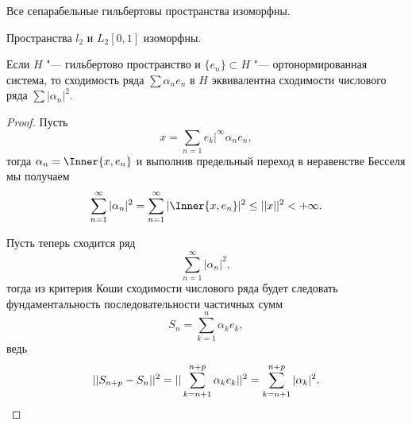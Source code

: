\documentclass[main]{subfiles}
\begin{document}
\begin{theorem*}
  Все сепарабельные гильбертовы пространства изоморфны.
\end{theorem*}

\begin{theorem*}
  Пространства \( l_2 \) и \( L_2[0, 1] \) изоморфны.
\end{theorem*}

\begin{theorem*}
  Если \( H \) "--- гильбертово пространство и
  \( \{ e_n \} \subset H  \) "---
  ортонормированная система,
  то сходимость ряда \( \sum \alpha_n e_n \) в \( H \)
  эквивалентна сходимости числового ряда \( \sum |\alpha_n|^2 \).
\end{theorem*}
\begin{proof}
  Пусть
  \[ x = \sum_{n = 1} e_k|^\infty \alpha_n e_n, \]
  тогда \( \alpha_n = \Inner{x, e_n} \) и выполнив
  предельный переход в неравенстве Бесселя мы
  получаем
  \[
    \sum_{n = 1}^\infty |\alpha_n|^2 =
    \sum_{n = 1}^\infty |\Inner{x, e_n}|^2 \le
    ||x||^2 < +\infty.
  \]

  Пусть теперь сходится ряд
  \[
    \sum_{n=1}^\infty |\alpha_n|^2,
  \]
  тогда из критерия Коши сходимости числового ряда
  будет следовать фундаментальность
  последовательности частичных сумм
  \[
    S_n = \sum_{k=1}^n \alpha_k e_k,
  \]
  ведь
  \[
    ||S_{n + p} - S_{n}||^2 =
    ||\sum_{k=n+1}^{n+p} \alpha_k e_k||^2 =
    \sum_{k=n+1}^{n+p} |\alpha_k|^2. \qedhere
  \]
\end{proof}
\end{document}
